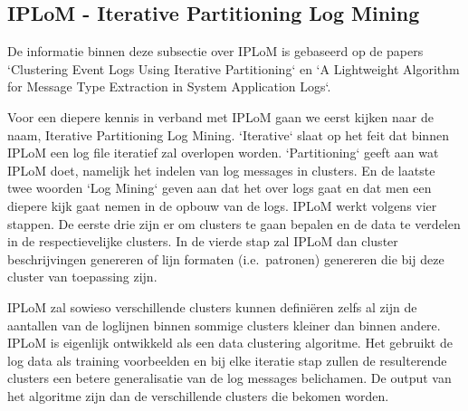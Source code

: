 \subsection{IPLoM - Iterative Partitioning Log Mining}
De informatie binnen deze subsectie over IPLoM is gebaseerd op de papers `Clustering Event Logs Using Iterative Partitioning` \autocite{makanju2009clustering} en `A Lightweight Algorithm for Message Type Extraction in System Application Logs`\autocite{5936060}.

Voor een diepere kennis in verband met IPLoM gaan we eerst kijken naar de naam, Iterative Partitioning Log Mining. `Iterative` slaat op het feit dat binnen IPLoM een log file iteratief zal overlopen worden. `Partitioning` geeft aan wat IPLoM doet, namelijk het indelen van log messages in clusters. En de laatste twee woorden `Log Mining` geven aan dat het over logs gaat en dat men een diepere kijk gaat nemen in de opbouw van de logs. IPLoM werkt volgens vier stappen. De eerste drie zijn er om clusters te gaan bepalen en de data te verdelen in de respectievelijke clusters. In de vierde stap zal IPLoM dan cluster beschrijvingen genereren of lijn formaten (i.e.\ patronen) genereren die bij deze cluster van toepassing zijn. 

IPLoM zal sowieso verschillende clusters kunnen definiëren zelfs al zijn de aantallen van de loglijnen binnen sommige clusters kleiner dan binnen andere. IPLoM is eigenlijk ontwikkeld als een data clustering algoritme. Het gebruikt de log data als training voorbeelden en bij elke iteratie stap zullen de resulterende clusters een betere generalisatie van de log messages belichamen. De output van het algoritme zijn dan de verschillende clusters die bekomen worden. 

